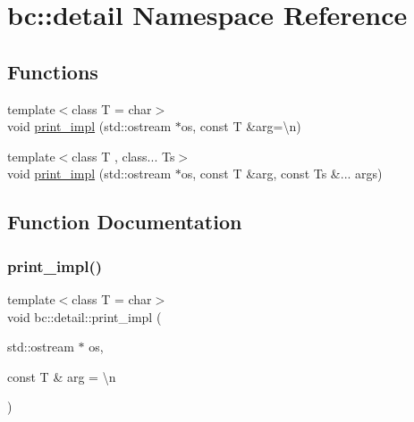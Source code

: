 \hypertarget{namespacebc_1_1detail}{}\section{bc\+:\+:detail Namespace Reference}
\label{namespacebc_1_1detail}
\subsection*{Functions}
\begin{DoxyCompactItemize}
\item 
{\footnotesize template$<$class T  = char$>$ }\\void \hyperlink{namespacebc_1_1detail_a5a7f3c0e4d0789597a73dd1206fc78b1}{print\+\_\+impl} (std\+::ostream $\ast$os, const T \&arg=\textquotesingle{}\textbackslash{}n\textquotesingle{})
\item 
{\footnotesize template$<$class T , class... Ts$>$ }\\void \hyperlink{namespacebc_1_1detail_ac686664816aa55a2e7164fee2b5fb170}{print\+\_\+impl} (std\+::ostream $\ast$os, const T \&arg, const Ts \&... args)
\end{DoxyCompactItemize}


\subsection{Function Documentation}
\mbox{\label{namespacebc_1_1detail_a5a7f3c0e4d0789597a73dd1206fc78b1}} 
\subsubsection{\texorpdfstring{print\+\_\+impl()}{print\_impl()}\hspace{0.1cm}{\footnotesize\ttfamily [1/2]}}
{\footnotesize\ttfamily template$<$class T  = char$>$ \\
void bc\+::detail\+::print\+\_\+impl (\begin{DoxyParamCaption}\item[{std\+::ostream $\ast$}]{os,  }\item[{const T \&}]{arg = {\ttfamily \textquotesingle{}\textbackslash{}n\textquotesingle{}} }\end{DoxyParamCaption})}

\mbox{\label{namespacebc_1_1detail_ac686664816aa55a2e7164fee2b5fb170}} 
